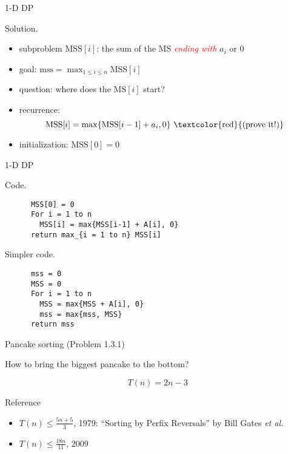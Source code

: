 \begin{frame}{1-D DP}
  \begin{block}{Solution.}
    \begin{itemize}
      \item subproblem $\text{MSS}[i]$: the sum of the MS \textcolor{red}{\it ending with} $a_{i}$ or 0
      \item goal: $\text{mss} = \max_{1 \le i \le n} \text{MSS}[i]$
      \item<2-> question: where does the $\text{MS}[i]$ start?
      \item<2-> recurrence: 
		\[ 
		  \text{MSS}[i] = \max \set{\text{MSS}[i-1] + a_{i}, 0} \text{ \textcolor{red}{(prove it!)}}
		\]
      \item<3-> initialization: $\text{MSS}[0] = 0$
    \end{itemize}

  \end{block}
\end{frame}
\begin{frame}[fragile]{1-D DP}
  \begin{block}{Code.}
    \begin{verbatim}
      MSS[0] = 0
      For i = 1 to n
        MSS[i] = max{MSS[i-1] + A[i], 0}
      return max_{i = 1 to n} MSS[i]
    \end{verbatim}
  \end{block}

  \pause

  \begin{block}{Simpler code.}
    \begin{verbatim}
      mss = 0
      MSS = 0
      For i = 1 to n
        MSS = max{MSS + A[i], 0}
        mss = max{mss, MSS}
      return mss
    \end{verbatim}
  \end{block}
\end{frame}
\begin{frame}{Pancake sorting (Problem 1.3.1)}

  \pause
  \centerline{How to bring the biggest pancake to the bottom?}

  \pause
  \[
	T(n) = 2n-3
  \]

  \pause
  \begin{alertblock}{Reference}
	\begin{itemize}
	  \item $T(n) \le \frac{5n+5}{3}$, 1979: ``Sorting by Perfix Reversals'' \pause by Bill Gates \emph{et al.}
		\pause
	  \item $T(n) \le \frac{18n}{11}$, 2009
	\end{itemize}
  \end{alertblock}
\end{frame}
